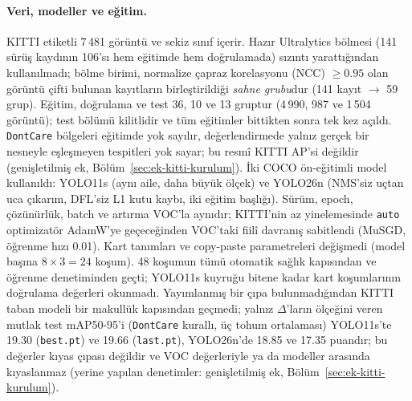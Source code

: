 \documentclass[pdflatex,iicol,sn-mathphys-num]{sn-jnl}
\begin{document}
\paragraph{Veri, modeller ve eğitim.}
KITTI \cite{geiger_2012_kitti} etiketli 7\,481 görüntü ve sekiz sınıf içerir. Hazır Ultralytics bölmesi (141 sürüş kaydının 106'sı hem eğitimde hem doğrulamada) sızıntı yarattığından kullanılmadı; bölme birimi, normalize çapraz korelasyonu (NCC) $\ge0.95$ olan görüntü çifti bulunan kayıtların birleştirildiği \emph{sahne grubu}dur (141 kayıt $\to$ 59 grup). Eğitim, doğrulama ve test 36, 10 ve 13 gruptur (4\,990, 987 ve 1\,504 görüntü); test bölümü kilitlidir ve tüm eğitimler bittikten sonra tek kez açıldı. \texttt{DontCare} bölgeleri eğitimde yok sayılır, değerlendirmede yalnız gerçek bir nesneyle eşleşmeyen tespitleri yok sayar; bu resmî KITTI AP'si değildir (genişletilmiş ek, Bölüm~\ref{sec:ek-kitti-kurulum}). İki COCO ön-eğitimli model kullanıldı: YOLO11s (aynı aile, daha büyük ölçek) ve YOLO26n \cite{jocher_2026_yolo26} (NMS'siz uçtan uca çıkarım, DFL'siz L1 kutu kaybı, iki eğitim başlığı). Sürüm, epoch, çözünürlük, batch ve artırma VOC'la aynıdır; KITTI'nin az yinelemesinde \texttt{auto} optimizatör AdamW'ye geçeceğinden VOC'taki fiilî davranış sabitlendi (MuSGD, öğrenme hızı 0.01). Kart tanımları ve copy-paste parametreleri değişmedi (model başına $8\times3=24$ koşum). 48 koşumun tümü otomatik sağlık kapısından ve öğrenme denetiminden geçti; YOLO11s kuyruğu bitene kadar kart koşumlarının doğrulama değerleri okunmadı. Yayımlanmış bir çıpa bulunmadığından KITTI taban modeli bir makullük kapısından geçmedi; yalnız $\Delta$'ların ölçeğini veren mutlak test mAP50-95'i (\texttt{DontCare} kurallı, üç tohum ortalaması) YOLO11s'te 19.30 (\texttt{best.pt}) ve 19.66 (\texttt{last.pt}), YOLO26n'de 18.85 ve 17.35 puandır; bu değerler kıyas çıpası değildir ve VOC değerleriyle ya da modeller arasında kıyaslanmaz (yerine yapılan denetimler: genişletilmiş ek, Bölüm~\ref{sec:ek-kitti-kurulum}).
\end{document}
